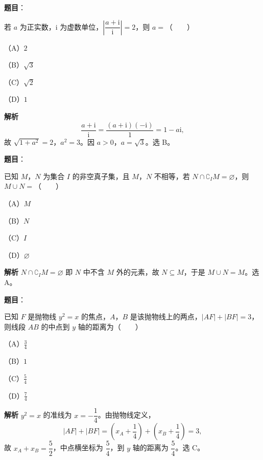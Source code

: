 
\begin{answer}

\textbf{题目}：

若 $a$ 为正实数，$\mathrm i$ 为虚数单位，$\left|\dfrac{a+\mathrm i}{\mathrm i}\right|=2$，则 $a=$\mbox{（　　）}

（A）$2$

（B）$\sqrt3$

（C）$\sqrt2$

（D）$1$

\textbf{解析}
\nopagebreak[4]
\[\frac{a+\mathrm i}{\mathrm i}=\frac{(a+\mathrm i)(-\mathrm i)}{1}=1-a\mathrm i,\]
故 $\sqrt{1+a^2}=2$，$a^2=3$。因 $a>0$，$a=\sqrt3$。选 B。


\end{answer}
\begin{answer}

\textbf{题目}：

已知 $M$，$N$ 为集合 $I$ 的非空真子集，且 $M$，$N$ 不相等，若 $N\cap\complement_I M=\varnothing$，则 $M\cup N=$\mbox{（　　）}

（A）$M$

（B）$N$

（C）$I$

（D）$\varnothing$

\textbf{解析}
$N\cap\complement_I M=\varnothing$ 即 $N$ 中不含 $M$ 外的元素，故 $N\subseteq M$，于是 $M\cup N=M$。选 A。


\end{answer}
\begin{answer}

\textbf{题目}：

已知 $F$ 是抛物线 $y^2=x$ 的焦点，$A$，$B$ 是该抛物线上的两点，$|AF|+|BF|=3$，则线段 $AB$ 的中点到 $y$ 轴的距离为\mbox{（　　）}

（A）$\frac34$

（B）$1$

（C）$\frac54$

（D）$\frac74$

\textbf{解析}
$y^2=x$ 的准线为 $x=-\dfrac14$。由抛物线定义，
\nopagebreak[4]
\[|AF|+|BF|=\left(x_A+\frac14\right)+\left(x_B+\frac14\right)=3,\]
故 $x_A+x_B=\dfrac52$，中点横坐标为 $\dfrac54$，到 $y$ 轴的距离为 $\dfrac54$。选 C。


\end{answer}
